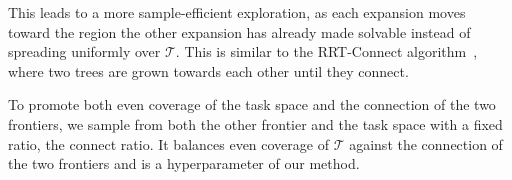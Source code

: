 

This leads to a more sample-efficient exploration, as each expansion moves toward the region the other expansion has already made solvable instead of spreading uniformly over $\mathcal{T}$. This is similar to the RRT-Connect algorithm~\citep{kuffner2000rrt}, where two trees are grown towards each other until they connect.

To promote both even coverage of the task space and the connection of the two frontiers, we sample from both the other frontier and the task space with a fixed ratio, the connect ratio. It balances even coverage of $\mathcal{T}$ against the connection of the two frontiers and is a hyperparameter of our method.